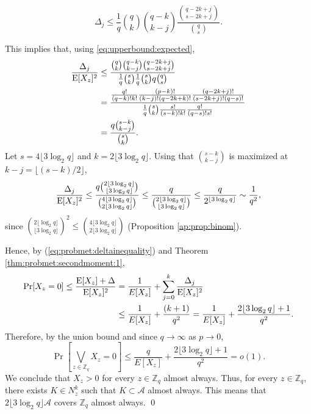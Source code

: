 \[\Delta_j \leq \frac{1}{q}\binom{q}{k}\binom{q - k}{k - j} \frac{\binom{q - 2k + j}{s - 2k + j}}{\binom{q}{s}}.\]
\par This implies that, using \ref{eq:upperbound:expected},
\begin{align*}
    \frac{\Delta_j}{\mathrm{E}[X_z]^2} &\leq \frac{\binom{q}{k} \binom{q - k}{k - j}\binom{q - 2k + j}{s - 2k + j}}{\frac{1}{q} \binom{s}{k}\frac{1}{q} \binom{s}{k}q\binom{q}{s}} \\
    &= \frac{\frac{q!}{(q - k)!k!}\frac{(p - k)!}{(k - j)!(q - 2k + k)!}\frac{(q - 2k + j)!}{(s - 2k + j)!(q - s)!}}{\frac{1}{q}\binom{s}{k}\frac{s!}{(s - k)!k!}\frac{q!}{(q - s)!s!}} \\
    &= \frac{q\binom{s - k}{k - j}}{\binom{s}{k}}.
\end{align*}
Let $s = 4\lfloor 3 \log_2 q \rfloor$ and $k = 2\lfloor 3 \log_2 q \rfloor$. Using that $\binom{s - k}{k - j}$ is maximized at $k - j = \lfloor (s - k) / 2\rfloor$,
\begin{align*}
\frac{\Delta_j}{\mathrm{E}[X_z]^2} \leq \frac{q \binom{2\lfloor 3 \log_2 q\rfloor}{\lfloor 3 \log_2 q \rfloor}}{\binom{4\lfloor 3\log_2 q \rfloor}{2\lfloor 3\log_2 q \rfloor}} \leq \frac{q}{\binom{2\lfloor 3 \log_2 q \rfloor }{ \lfloor 3 \log_2 q \rfloor}} \leq \frac{q}{2^{\lfloor 3 \log_2 q \rfloor}} \sim \frac{1}{q^2},
\end{align*}
since \(\binom{2\lfloor \log_2 q \rfloor}{\lfloor 3 \log_2 q \rfloor}^2 \leq \binom{4\lfloor 3 \log_2 q \rfloor }{2\lfloor 3 \log_2 q \rfloor}\) (Proposition \ref{ap:prop:binom}).   \par
Hence, by (\ref{eq:probmet:deltainequality}) and Theorem \ref{thm:probmet:secondmoment:1},
\begin{align*}
\mathrm{Pr}[X_z = 0] \leq \frac{\mathrm{E}[X_z] + \Delta}{\mathrm{E}[X_z]^2} &= \frac{1}{E[X_z]} + \sum_{j = 0}^k \frac{\Delta_j}{\mathrm{E}[X_z]^2} \\
&\leq \frac{1}{E[X_z]} + \frac{(k + 1)}{q^2} = \frac{1}{E[X_z]} + \frac{2\lfloor 3 \log_2 q\rfloor + 1}{q^2}.
\end{align*}
Therefore, by the union bound and since $q \to \infty$ as $p \to 0$,
\[\Pr\left[\bigvee_{z \in \mathbb{Z}_q} X_z = 0\right] \leq \frac{q}{E[X_z]} + \frac{2\lfloor 3 \log_2 q\rfloor + 1}{q^2} = o(1).\]
We conclude that $X_z > 0$ for every $z \in \mathbb{Z}_q$ almost always. Thus, for every $z \in \mathbb{Z}_q$, there exists $K \in N_z^k$ such that $K \subset \mathcal{A}$ almost always. This means that $2\lfloor 3 \log_2 q\rfloor \mathcal{A}$ covers $\mathbb{Z}_q$ almost always. \qed

